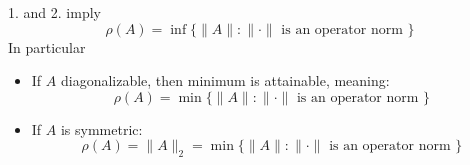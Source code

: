 \documentclass[../main/main.tex]{subfiles}
\begin{document}
\begin{remark}
  1. and 2. imply \[
\rho(A) = \inf \{\|A\|: \|\cdot\| \text{ is an operator norm }\}
  \]
  In particular
  \begin{itemize}
    \item If $A$ diagonalizable, then minimum is attainable, meaning:  \[
\rho(A) = \min \{\|A\|: \|\cdot\| \text{ is an operator norm }\}
          \]
    \item If $A$ is symmetric: \[
\rho(A) = \|A\|_{2} = \min \{\|A\|: \|\cdot\| \text{ is an operator norm }\}
          \]
  \end{itemize}
\end{remark}
\end{document}
